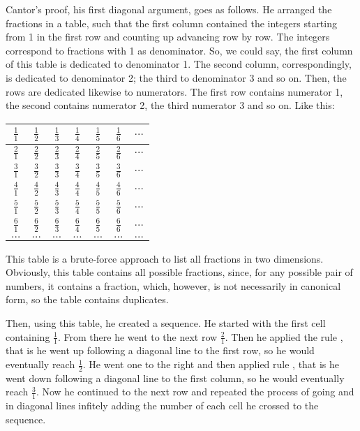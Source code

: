\documentclass[tikz]{scrreprt}
\newcommand{\texfamily}{\fontfamily{cmtex}\selectfont}
\begin{document}
Cantor's proof, his first diagonal argument,
goes as follows. He arranged the fractions
in a table, such that the first column contained
the integers starting from 1 in the first row
and counting up advancing row by row.
The integers correspond to fractions with 1
as denominator. So, we could say,
the first column of this table is dedicated
to denominator 1. The second column, correspondingly,
is dedicated to denominator 2; the third
to denominator 3 and so on.
Then, the rows are dedicated likewise to numerators.
The first row contains numerator 1, the second
contains numerator 2, the third numerator 3
and so on.
Like this:

\begin{center}
\begingroup
\renewcommand{\arraystretch}{1.5}
\begin{tabular}{|c|c|c|c|c|c|c}\hline
$\frac{1}{1}$ & $\frac{1}{2}$ & $\frac{1}{3}$ & $\frac{1}{4}$ & $\frac{1}{5}$ & $\frac{1}{6}$ & $\dots$\\\hline
$\frac{2}{1}$ & $\frac{2}{2}$ & $\frac{2}{3}$ & $\frac{2}{4}$ & $\frac{2}{5}$ & $\frac{2}{6}$ & $\dots$\\\hline
$\frac{3}{1}$ & $\frac{3}{2}$ & $\frac{3}{3}$ & $\frac{3}{4}$ & $\frac{3}{5}$ & $\frac{3}{6}$ & $\dots$\\\hline
$\frac{4}{1}$ & $\frac{4}{2}$ & $\frac{4}{3}$ & $\frac{4}{4}$ & $\frac{4}{5}$ & $\frac{4}{6}$ & $\dots$\\\hline
$\frac{5}{1}$ & $\frac{5}{2}$ & $\frac{5}{3}$ & $\frac{5}{4}$ & $\frac{5}{5}$ & $\frac{5}{6}$ & $\dots$\\\hline
$\frac{6}{1}$ & $\frac{6}{2}$ & $\frac{6}{3}$ & $\frac{6}{4}$ & $\frac{6}{5}$ & $\frac{6}{6}$ & $\dots$\\\hline
$\dots$       & $\dots$       & $\dots$       & $\dots$       & $\dots$       & $\dots$       & $\dots$
\end{tabular}
\endgroup
\end{center}

This table is a brute-force approach
to list all fractions in two dimensions.
Obviously, this table contains all possible fractions,
since, for any possible pair of numbers, it contains
a fraction, which, however, is not necessarily
in canonical form, so the table contains duplicates.

Then, using this table, he created a sequence.
He started with the first cell containing $\frac{1}{1}$.
From there he went to the next row $\frac{2}{1}$.
Then he applied the rule \text{\texfamily up},
that is he went up following a diagonal line to the first row,
so he would eventually reach $\frac{1}{2}$.
He went one to the right and then applied rule \text{\texfamily down},
that is he went down following a diagonal line
to the first column, so he would eventually reach $\frac{3}{1}$.
Now he continued to the next row and repeated 
the process of going \text{\texfamily up} and \text{\texfamily down} in
diagonal lines infitely adding the number of each
cell he crossed to the sequence.
\end{document}
